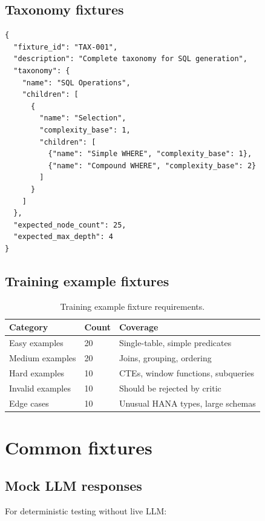 \subsection{Taxonomy fixtures}

\begin{lstlisting}[basicstyle=\ttfamily\small,caption={Taxonomy fixture structure.}]
{
  "fixture_id": "TAX-001",
  "description": "Complete taxonomy for SQL generation",
  "taxonomy": {
    "name": "SQL Operations",
    "children": [
      {
        "name": "Selection",
        "complexity_base": 1,
        "children": [
          {"name": "Simple WHERE", "complexity_base": 1},
          {"name": "Compound WHERE", "complexity_base": 2}
        ]
      }
    ]
  },
  "expected_node_count": 25,
  "expected_max_depth": 4
}
\end{lstlisting}

\subsection{Training example fixtures}

\begin{table}[htbp]
\centering
\caption{Training example fixture requirements.}
\label{tab:training-fixtures}
\footnotesize
\begin{tabularx}{\linewidth}{@{}l l X@{}}
\toprule
\textbf{Category} & \textbf{Count} & \textbf{Coverage} \\ \midrule
Easy examples & 20 & Single-table, simple predicates \\
Medium examples & 20 & Joins, grouping, ordering \\
Hard examples & 10 & CTEs, window functions, subqueries \\
Invalid examples & 10 & Should be rejected by critic \\
Edge cases & 10 & Unusual HANA types, large schemas \\
\bottomrule
\end{tabularx}
\end{table}

\section{Common fixtures}

\subsection{Mock LLM responses}

For deterministic testing without live LLM:

